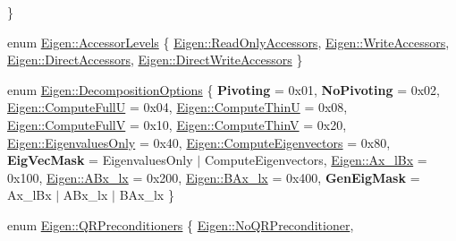 \begin{DoxyCompactItemize}
 \}
\item 
enum \mbox{\hyperlink{group__enums_ga9f93eac38eb83deb0e8dbd42ddf11d5d}{Eigen\+::\+Accessor\+Levels}} \{ \mbox{\hyperlink{group__enums_gga9f93eac38eb83deb0e8dbd42ddf11d5daa1f2b0e6a668b11f2958940965d2b572}{Eigen\+::\+Read\+Only\+Accessors}}, 
\mbox{\hyperlink{group__enums_gga9f93eac38eb83deb0e8dbd42ddf11d5dabcadf08230fb1a5ef7b3195745d3a458}{Eigen\+::\+Write\+Accessors}}, 
\mbox{\hyperlink{group__enums_gga9f93eac38eb83deb0e8dbd42ddf11d5da50108ad00095928de06228470ceab09e}{Eigen\+::\+Direct\+Accessors}}, 
\mbox{\hyperlink{group__enums_gga9f93eac38eb83deb0e8dbd42ddf11d5dacbe59d09ba2fdf8eac127bff1a1f0234}{Eigen\+::\+Direct\+Write\+Accessors}}
 \}
\item 
enum \mbox{\hyperlink{group__enums_gae3e239fb70022eb8747994cf5d68b4a9}{Eigen\+::\+Decomposition\+Options}} \{ \newline
{\bfseries Pivoting} = 0x01, 
{\bfseries No\+Pivoting} = 0x02, 
\mbox{\hyperlink{group__enums_ggae3e239fb70022eb8747994cf5d68b4a9a9fa9302d510cee20c26311154937e23f}{Eigen\+::\+Compute\+FullU}} = 0x04, 
\mbox{\hyperlink{group__enums_ggae3e239fb70022eb8747994cf5d68b4a9aa7fb4e98834788d0b1b0f2b8467d2527}{Eigen\+::\+Compute\+ThinU}} = 0x08, 
\newline
\mbox{\hyperlink{group__enums_ggae3e239fb70022eb8747994cf5d68b4a9a36581f7c662f7def31efd500c284f930}{Eigen\+::\+Compute\+FullV}} = 0x10, 
\mbox{\hyperlink{group__enums_ggae3e239fb70022eb8747994cf5d68b4a9a540036417bfecf2e791a70948c227f47}{Eigen\+::\+Compute\+ThinV}} = 0x20, 
\mbox{\hyperlink{group__enums_ggae3e239fb70022eb8747994cf5d68b4a9afd06633f270207c373875fd7ca03e906}{Eigen\+::\+Eigenvalues\+Only}} = 0x40, 
\mbox{\hyperlink{group__enums_ggae3e239fb70022eb8747994cf5d68b4a9a7f7d17fba3c9bb92158e346d5979d0f4}{Eigen\+::\+Compute\+Eigenvectors}} = 0x80, 
\newline
{\bfseries Eig\+Vec\+Mask} = Eigenvalues\+Only $\vert$ Compute\+Eigenvectors, 
\mbox{\hyperlink{group__enums_ggae3e239fb70022eb8747994cf5d68b4a9a5eb11a88a4bd445f58f1b24598d3848f}{Eigen\+::\+Ax\+\_\+l\+Bx}} = 0x100, 
\mbox{\hyperlink{group__enums_ggae3e239fb70022eb8747994cf5d68b4a9a9a7d9813cec527e299a36b749b0f7e1e}{Eigen\+::\+A\+Bx\+\_\+lx}} = 0x200, 
\mbox{\hyperlink{group__enums_ggae3e239fb70022eb8747994cf5d68b4a9a9870817d373c41ba0dc7f6b5ab0895b8}{Eigen\+::\+B\+Ax\+\_\+lx}} = 0x400, 
\newline
{\bfseries Gen\+Eig\+Mask} = Ax\+\_\+l\+Bx $\vert$ A\+Bx\+\_\+lx $\vert$ B\+Ax\+\_\+lx
 \}
\item 
enum \mbox{\hyperlink{group__enums_ga46eba0d5c621f590b8cf1b53af31d56e}{Eigen\+::\+Q\+R\+Preconditioners}} \{ \mbox{\hyperlink{group__enums_gga46eba0d5c621f590b8cf1b53af31d56ea2e95bc818f975b19def01e93d240dece}{Eigen\+::\+No\+Q\+R\+Preconditioner}}, 

\end{DoxyCompactItemize}
